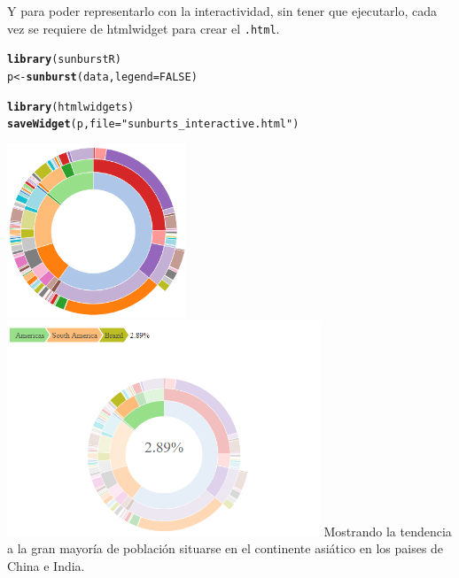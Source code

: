 \documentclass{article}\usepackage[]{graphicx}\usepackage[]{color}
\makeatletter
\newcommand{\hlnum}[1]{\textcolor[rgb]{0.686,0.059,0.569}{#1}}%
\newcommand{\hlstr}[1]{\textcolor[rgb]{0.192,0.494,0.8}{#1}}%
\newcommand{\hlstd}[1]{\textcolor[rgb]{0.345,0.345,0.345}{#1}}%
\newcommand{\hlkwb}[1]{\textcolor[rgb]{0.69,0.353,0.396}{#1}}%
\newcommand{\hlkwc}[1]{\textcolor[rgb]{0.333,0.667,0.333}{#1}}%
\newcommand{\hlkwd}[1]{\textcolor[rgb]{0.737,0.353,0.396}{\textbf{#1}}}%
\newenvironment{kframe}{%
 \def\at@end@of@kframe{}%
 \ifinner\ifhmode%
  \def\at@end@of@kframe{\end{minipage}}%
  \begin{minipage}{\columnwidth}%
 \fi\fi%
 \def\FrameCommand##1{\hskip\@totalleftmargin \hskip-\fboxsep
 \colorbox{shadecolor}{##1}\hskip-\fboxsep
     \hskip-\linewidth \hskip-\@totalleftmargin \hskip\columnwidth}%
 \MakeFramed {\advance\hsize-\width
   \@totalleftmargin\z@ \linewidth\hsize
   \@setminipage}}%
 {\par\unskip\endMakeFramed%
 \at@end@of@kframe}
\newenvironment{knitrout}{}{} %
\makeatother
\begin{document}
Y para poder representarlo con la interactividad, sin tener que ejecutarlo, cada vez se requiere de htmlwidget para crear el \texttt{.html}.
\begin{knitrout}
\color{fgcolor}\begin{kframe}
\begin{alltt}
\hlkwd{library}\hlstd{(sunburstR)}
\hlstd{p} \hlkwb{<-} \hlkwd{sunburst}\hlstd{(data,} \hlkwc{legend} \hlstd{=} \hlnum{FALSE}\hlstd{)}

\hlkwd{library}\hlstd{(htmlwidgets)}
\hlkwd{saveWidget}\hlstd{(p,} \hlkwc{file} \hlstd{=} \hlstr{"sunburts_interactive.html"}\hlstd{)}
\end{alltt}
\end{kframe}
\end{knitrout}
\vbox{
    \centering
    \includegraphics[width=0.4\textwidth]{imag/sunburts_interactive_1}
}
\vbox{
    \centering
    \includegraphics[width=0.7\textwidth]{imag/sunburts_interactive_2}
}
Mostrando la tendencia a la gran mayor\'ia de poblaci\'on situarse en el continente asi\'atico en los paises de China e India.
\end{document}
